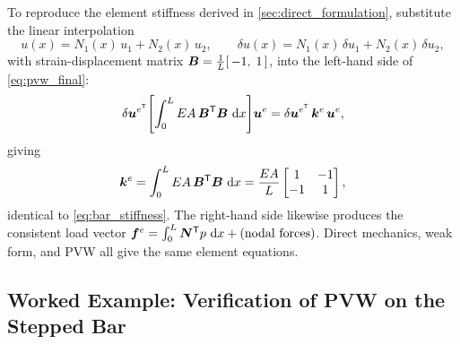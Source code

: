 To reproduce the element stiffness derived in \cref{sec:direct_formulation},
substitute the linear interpolation
\begin{equation}
    u(x) = N_1(x)\,u_1 + N_2(x)\,u_2,
    \qquad
    \delta u(x) = N_1(x)\,\delta u_1 + N_2(x)\,\delta u_2 ,
\end{equation}
with strain-displacement matrix $\bm{B} = \tfrac{1}{L}[\,-1,\;1\,]$, into
the left-hand side of \cref{eq:pvw_final}:
\[
    \delta \bm{u}^{e^{\mathsf{T}}}\!
    \left[\int_0^L EA\,\bm{B}^{\mathsf{T}} \bm{B}\,\,\mathrm{d} x\right]
    \!\bm{u}^e
    = \delta \bm{u}^{e^{\mathsf{T}}}\,\bm{k}^e\,\bm{u}^e ,
\]
giving
\[
    \bm{k}^e
    = \int_0^L EA\,\bm{B}^{\mathsf{T}} \bm{B}\,\,\mathrm{d} x
    = \frac{EA}{L}\begin{bmatrix} 1 & -1 \\ -1 & 1 \end{bmatrix} ,
\]
identical to \cref{eq:bar_stiffness}. The right-hand side likewise produces
the consistent load vector $\bm{f}^e = \int_0^L \bm{N}^{\mathsf{T}} p\,\,\mathrm{d} x +
(\text{nodal forces})$. Direct mechanics, weak form, and PVW all give the same
element equations.

\subsection{Worked Example: Verification of PVW on the Stepped Bar}
\label{sec:pvw_verification}


